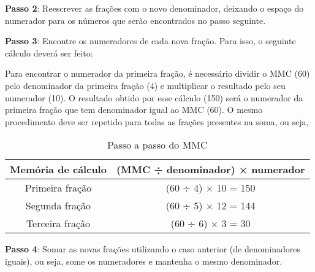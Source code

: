     \noindent
	\textbf{Passo 2}: Reescrever as frações com o novo denominador, deixando o espaço do numerador para os números que serão encontrados no passo seguinte.

        \begin{texample}
        \centering
        \end{texample}

    \noindent
	\textbf{Passo 3}: Encontre os numeradores de cada nova fração. Para isso, o seguinte cálculo deverá ser feito:

    Para encontrar o numerador da primeira fração, é necessário dividir o MMC (60) pelo denominador da primeira fração (4) e multiplicar o resultado pelo seu numerador (10). O resultado obtido por esse cálculo (150) será o numerador da primeira fração que tem denominador igual ao MMC (60). O mesmo procedimento deve ser repetido para todas as frações presentes na soma, ou seja,

        \begin{texample}
        \centering
        \end{texample}
	
	\begin{table}[htbp]
		\centering
		\caption{Passo a passo do MMC}
		\begin{tabular}{cc}
			\hline
			Memória de cálculo &  (MMC ÷ denominador) × numerador \bigstrut\\
			\hline
			Primeira fração  & (60 ÷ 4) × 10 = 150 \bigstrut[t]\\
			Segunda fração  & (60 ÷ 5) × 12 = 144 \\
			Terceira fração &  (60 ÷ 6) × 3 = 30 \\
            \hline
		\end{tabular}%
		\label{tab:addlabel}%
	\end{table}%

    \noindent
	\textbf{Passo 4}: Somar as novas frações utilizando o caso anterior (de denominadores iguais), ou seja, some os numeradores e mantenha o mesmo denominador.

        \begin{texample}
        \centering
        \end{texample}
	

